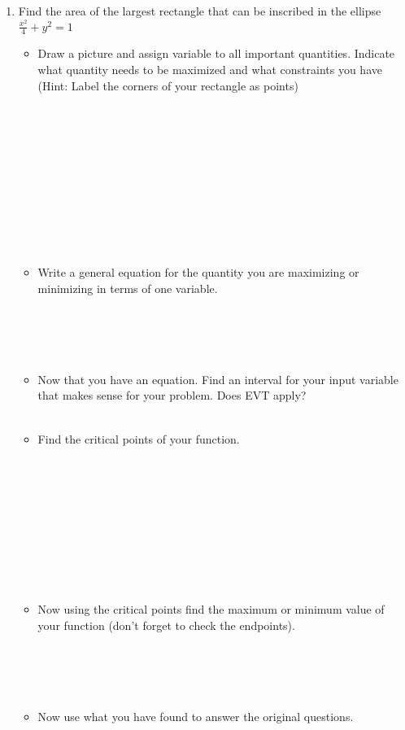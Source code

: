 \documentclass[12pt]{article}
\begin{document}
\begin{enumerate}
    \newpage
    \item Find the area of the largest rectangle that can be inscribed in the ellipse $\displaystyle{\frac{x^2}{4}+y^2}=1$
    \begin{itemize}
        \item Draw a picture and assign variable to all important quantities. Indicate what quantity needs to be maximized and what constraints you have (Hint: Label the corners of your rectangle as points)\\\\\\\\\\\\\\\\\\\\\\

        \item Write a general equation for the quantity you are maximizing or minimizing in terms of one variable.\\\\\\\\\\

        \item Now that you have an equation. Find an interval for your input variable that makes sense for your problem. Does EVT apply? \\\\
        
        \item Find the critical points of your function.\\\\\\\\\\\\\\\\\\\\

        \item Now using the critical points find the maximum or minimum value of your function (don't forget to check the endpoints).\\\\\\\\\\

        \item Now use what you have found to answer the original questions.
    \end{itemize}
        
    
\end{enumerate}
\end{document}
